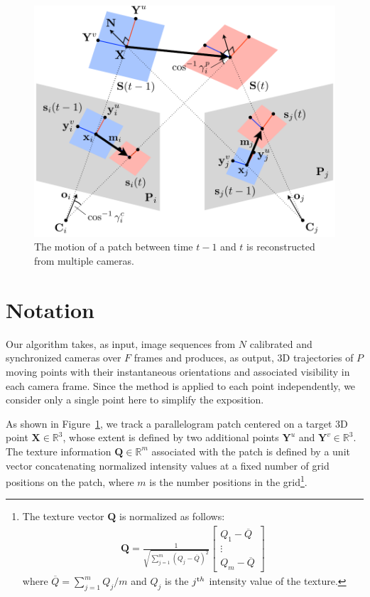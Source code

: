 \begin{figure}[t]
	\begin{center}
		\includegraphics[width=0.6\linewidth]{figures/Notation_final}
		\caption{The motion of a patch between time $t-1$ and $t$ is reconstructed from multiple cameras.}
		\label{fig:notation}
	\end{center}
\end{figure}
\section{Notation}
Our algorithm takes, as input, image sequences from $N$ calibrated and synchronized cameras over $F$ frames and produces, as output, 3D trajectories of $P$ moving points with their instantaneous orientations and associated visibility in each camera frame. Since the method is applied to each point independently, we consider only a single point here to simplify the exposition.

As shown in Figure~\ref{fig:notation}, we track a parallelogram patch centered on a target 3D point $\mathbf{X} \in \mathds{R}^3$, whose extent is defined by two additional points $\mathbf{Y}^u$ and $\mathbf{Y}^v \in \mathds{R}^3$. The texture information $\mathbf{Q} \in \mathds{R}^m$ associated with the patch is defined by a unit vector concatenating normalized intensity values at a fixed number of grid positions on the patch, where $m$ is the number positions in the grid\footnote{The texture vector $\mathbf{\mathbf{Q}}$ is normalized as follows:
	\begin{eqnarray}
	\mathbf{Q} = \frac{1}{\sqrt{\sum_{j=1}^m (Q_j-\overline{Q})^2}} \left[\begin{array}{c}Q_1-\overline{Q}\\\vdots\\ Q_m-\overline{Q} \end{array}\right] \label{Eq:normalized_texture}
	\end{eqnarray}
	where $\overline{Q} = \sum_{j=1}^m Q_j / m$ and $Q_j$ is the $j^{\textrm th}$ intensity value of the texture.}. 

